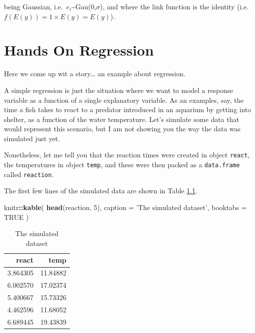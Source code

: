 \documentclass[
]{book}
\newenvironment{Shaded}{\begin{snugshade}}{\end{snugshade}}
\newcommand{\DataTypeTok}[1]{\textcolor[rgb]{0.13,0.29,0.53}{#1}}
\newcommand{\DecValTok}[1]{\textcolor[rgb]{0.00,0.00,0.81}{#1}}
\newcommand{\KeywordTok}[1]{\textcolor[rgb]{0.13,0.29,0.53}{\textbf{#1}}}
\newcommand{\NormalTok}[1]{#1}
\newcommand{\OperatorTok}[1]{\textcolor[rgb]{0.81,0.36,0.00}{\textbf{#1}}}
\newcommand{\OtherTok}[1]{\textcolor[rgb]{0.56,0.35,0.01}{#1}}
\newcommand{\StringTok}[1]{\textcolor[rgb]{0.31,0.60,0.02}{#1}}
\begin{document}
being Gaussian, i.e.~\(e_i\)\textasciitilde Gau(0,\(\sigma\)), and where the link function is the identity (i.e.~\(f(E(y))=1 \times E(y)=E(y)\)).

\hypertarget{handson}{%
\chapter{Hands On Regression}\label{handson}}

Here we come up wit a story\ldots{} an example about regression.

A simple regression is just the situation where we want to model a response variable as a function of a single explanatory variable. As an examples, say, the time a fish takes to react to a predator introduced in an aquarium by getting into shelter, as a function of the water temperature. Let's simulate some data that would represent this scenario, but I am not showing you the way the data was simulated just yet.

Nonetheless, let me tell you that the reaction times were created in object \texttt{react}, the temperatures in object \texttt{temp}, and these were then packed as a \texttt{data.frame} called \texttt{reaction}.

The first few lines of the simulated data are shown in Table \ref{tab:Ttab1}.

\begin{Shaded}
\begin{Highlighting}[]
\NormalTok{knitr}\OperatorTok{::}\KeywordTok{kable}\NormalTok{(}
  \KeywordTok{head}\NormalTok{(reaction, }\DecValTok{5}\NormalTok{), }\DataTypeTok{caption =} \StringTok{'The simulated dataset'}\NormalTok{,}
  \DataTypeTok{booktabs =} \OtherTok{TRUE}
\NormalTok{)}
\end{Highlighting}
\end{Shaded}

\begin{table}

\caption{\label{tab:Ttab1}The simulated dataset}
\centering
\begin{tabular}[t]{rr}
\toprule
react & temp\\
\midrule
3.864305 & 11.84882\\
6.002570 & 17.02374\\
5.400667 & 15.73326\\
4.462596 & 11.68052\\
6.689445 & 19.43839\\
\bottomrule
\end{tabular}
\end{table}
\end{document}
